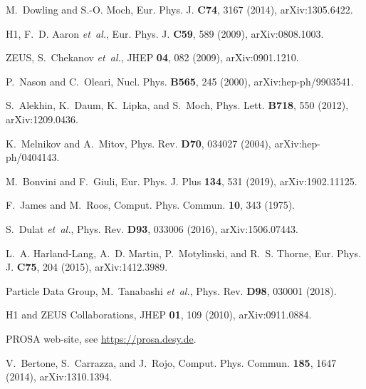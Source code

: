 \documentclass[a4paper,11pt]{article}
\begin{document}
\begin{thebibliography}{99}
M.~Dowling and S.-O. Moch,
\newblock Eur. Phys. J. {\bf C74}, 3167 (2014), arXiv:1305.6422.

H1, F.~D. Aaron {\em et~al.},
\newblock Eur. Phys. J. {\bf C59}, 589 (2009), arXiv:0808.1003.

ZEUS, S.~Chekanov {\em et~al.},
\newblock JHEP {\bf 04}, 082 (2009), arXiv:0901.1210.

P.~Nason and C.~Oleari,
\newblock Nucl. Phys. {\bf B565}, 245 (2000), arXiv:hep-ph/9903541.

S.~Alekhin, K.~Daum, K.~Lipka, and S.~Moch,
\newblock Phys. Lett. {\bf B718}, 550 (2012), arXiv:1209.0436.

K.~Melnikov and A.~Mitov,
\newblock Phys. Rev. {\bf D70}, 034027 (2004), arXiv:hep-ph/0404143.

M.~Bonvini and F.~Giuli,
\newblock Eur. Phys. J. Plus {\bf 134}, 531 (2019), arXiv:1902.11125.

F.~James and M.~Roos,
\newblock Comput. Phys. Commun. {\bf 10}, 343 (1975).

S.~Dulat {\em et~al.},
\newblock Phys. Rev. {\bf D93}, 033006 (2016), arXiv:1506.07443.

L.~A. Harland-Lang, A.~D. Martin, P.~Motylinski, and R.~S. Thorne,
\newblock Eur. Phys. J. {\bf C75}, 204 (2015), arXiv:1412.3989.

Particle Data Group, M.~Tanabashi {\em et~al.},
\newblock Phys. Rev. {\bf D98}, 030001 (2018).

{H1 and ZEUS Collaborations},
\newblock JHEP {\bf 01}, 109 (2010), arXiv:0911.0884.

{PROSA} web-site,
\newblock see \url{https://prosa.desy.de}.

V.~Bertone, S.~Carrazza, and J.~Rojo,
\newblock Comput. Phys. Commun. {\bf 185}, 1647 (2014), arXiv:1310.1394.


\end{thebibliography}
\end{document}
